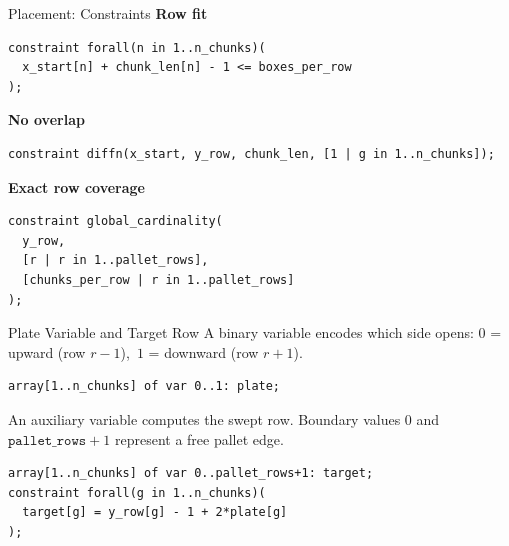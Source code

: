 \documentclass[aspectratio=169,xcolor=dvipsnames]{beamer}
\begin{document}

\begin{frame}[fragile]{Placement: Constraints}
    \textbf{Row fit}
    \begin{lstlisting}
constraint forall(n in 1..n_chunks)(
  x_start[n] + chunk_len[n] - 1 <= boxes_per_row
);
    \end{lstlisting}

    \vspace{0.25cm}
    \textbf{No overlap}
    \begin{lstlisting}
constraint diffn(x_start, y_row, chunk_len, [1 | g in 1..n_chunks]);
    \end{lstlisting}

    \vspace{0.25cm}
    \textbf{Exact row coverage}
    \begin{lstlisting}
constraint global_cardinality(
  y_row,
  [r | r in 1..pallet_rows],
  [chunks_per_row | r in 1..pallet_rows]
);
    \end{lstlisting}
\end{frame}


\begin{frame}[fragile]{Plate Variable and Target Row}
    A binary variable encodes which side opens: $0$ = upward (row $r-1$),\ $1$ = downward (row $r+1$).

    \vspace{0.3cm}
    \begin{lstlisting}
array[1..n_chunks] of var 0..1: plate;
    \end{lstlisting}

    \vspace{0.4cm}
    An auxiliary variable computes the swept row. Boundary values $0$ and
    $\texttt{pallet\_rows}+1$ represent a free pallet edge.

    \vspace{0.3cm}
    \begin{lstlisting}
array[1..n_chunks] of var 0..pallet_rows+1: target;
constraint forall(g in 1..n_chunks)(
  target[g] = y_row[g] - 1 + 2*plate[g]
);
    \end{lstlisting}
\end{frame}

\end{document}
